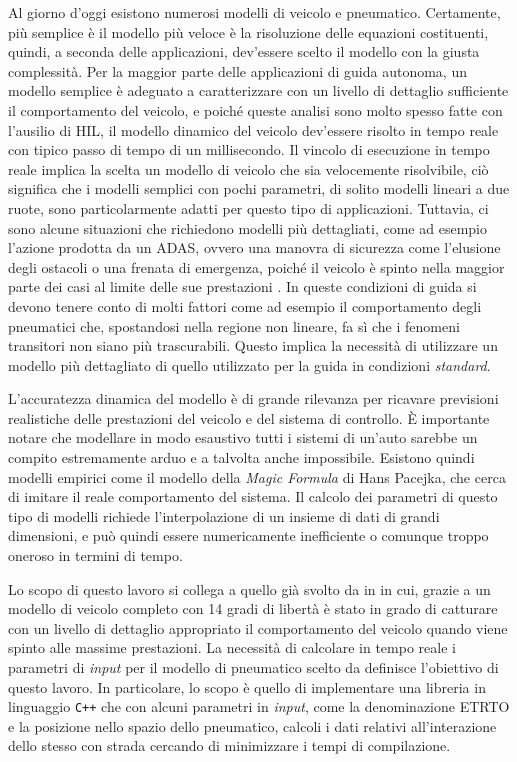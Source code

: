 Al giorno d'oggi esistono numerosi modelli di veicolo e pneumatico. Certamente, più semplice è il modello più veloce è la risoluzione delle equazioni costituenti, quindi, a seconda delle applicazioni, dev'essere scelto il modello con la giusta complessità. Per la maggior parte delle applicazioni di guida autonoma, un modello semplice è adeguato a caratterizzare con un livello di dettaglio sufficiente il comportamento del veicolo, e poiché queste analisi sono molto spesso fatte con l'ausilio di \ac{HIL}, il modello dinamico del veicolo dev'essere risolto in tempo reale con tipico passo di tempo di un millisecondo. Il vincolo di esecuzione in tempo reale implica la scelta un modello di veicolo che sia velocemente risolvibile, ciò significa che i modelli semplici con pochi parametri, di solito modelli lineari a due ruote, sono particolarmente adatti per questo tipo di applicazioni. Tuttavia, ci sono alcune situazioni che richiedono modelli più dettagliati, come ad esempio l'azione prodotta da un \ac{ADAS}, ovvero una manovra di sicurezza come l'elusione degli ostacoli o una frenata di emergenza, poiché il veicolo è spinto nella maggior parte dei casi al limite delle sue prestazioni \cite{impacts}. In queste condizioni di guida si devono tenere conto di molti fattori come ad esempio il comportamento degli pneumatici che, spostandosi nella regione non lineare, fa sì che i fenomeni transitori non siano più trascurabili. Questo implica la necessità di utilizzare un modello più dettagliato di quello utilizzato per la guida in condizioni \textit{standard}.

L'accuratezza dinamica del modello è di grande rilevanza per ricavare previsioni realistiche delle prestazioni del veicolo e del sistema di controllo. È importante notare che modellare in modo esaustivo tutti i sistemi di un'auto sarebbe un compito estremamente arduo e a talvolta anche impossibile. Esistono quindi modelli empirici come il modello della \textit{Magic Formula} di Hans Pacejka, che cerca di imitare il reale comportamento del sistema. Il calcolo dei parametri di questo tipo di modelli richiede l'interpolazione di un insieme di dati di grandi dimensioni, e può quindi essere numericamente inefficiente o comunque troppo oneroso in termini di tempo.

Lo scopo di questo lavoro si collega a quello già svolto da \citeauthor{Larcher} in \cite{Larcher} in cui, grazie a un modello di veicolo completo con 14 gradi di libertà è stato in grado di catturare con un livello di dettaglio appropriato il comportamento del veicolo quando viene spinto alle massime prestazioni. La necessità di calcolare in tempo reale i parametri di \textit{input} per il modello di pneumatico scelto da \cite{Larcher} definisce l'obiettivo di questo lavoro. In particolare, lo scopo è quello di implementare una libreria in linguaggio \texttt{C++} che con alcuni parametri in \textit{input}, come la denominazione \ac{ETRTO} e la posizione nello spazio dello pneumatico, calcoli i dati relativi all'interazione dello stesso con strada cercando di minimizzare i tempi di compilazione.